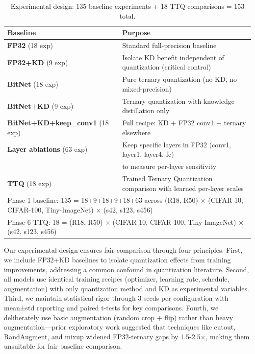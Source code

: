 \begin{table}[h]
\centering
\caption{Experimental design: 135 baseline experiments + 18 TTQ comparisons = 153 total.}
\label{tab:experiment_matrix}
\begin{tabular}{lp{10cm}}
\toprule
\textbf{Baseline} & \textbf{Purpose} \\
\midrule
\textbf{FP32} (18 exp) & Standard full-precision baseline \\
\textbf{FP32+KD} (9 exp) & Isolate KD benefit independent of quantization (critical control) \\
\textbf{BitNet} (18 exp) & Pure ternary quantization (no KD, no mixed-precision) \\
\textbf{BitNet+KD} (9 exp) & Ternary quantization with knowledge distillation only \\
\textbf{BitNet+KD+keep\_conv1} (18 exp) & Full recipe: KD + FP32 conv1 + ternary elsewhere \\
\midrule
\textbf{Layer ablations} (63 exp) & Keep specific layers in FP32 (conv1, layer1, layer4, fc) \\
                                   & to measure per-layer sensitivity \\
\bottomrule
\midrule
\textbf{TTQ} (18 exp) & Trained Ternary Quantization comparison with learned per-layer scales \\
\bottomrule
\multicolumn{2}{l}{\footnotesize Phase 1 baseline: 135 = 18+9+18+9+18+63 across (R18, R50) × (CIFAR-10, CIFAR-100, Tiny-ImageNet) × (s42, s123, s456)} \\
\multicolumn{2}{l}{\footnotesize Phase 6 TTQ: 18 = (R18, R50) × (CIFAR-10, CIFAR-100, Tiny-ImageNet) × (s42, s123, s456)}
\end{tabular}
\end{table}

Our experimental design ensures fair comparison through four principles. First, we include FP32+KD baselines to isolate quantization effects from training improvements, addressing a common confound in quantization literature. Second, all models use identical training recipes (optimizer, learning rate, schedule, augmentation) with only quantization method and KD as experimental variables. Third, we maintain statistical rigor through 3 seeds per configuration with mean±std reporting and paired t-tests for key comparisons. Fourth, we deliberately use basic augmentation (random crop + flip) rather than heavy augmentation—prior exploratory work suggested that techniques like cutout, RandAugment, and mixup widened FP32-ternary gaps by 1.5-2.5×, making them unsuitable for fair baseline comparison.

